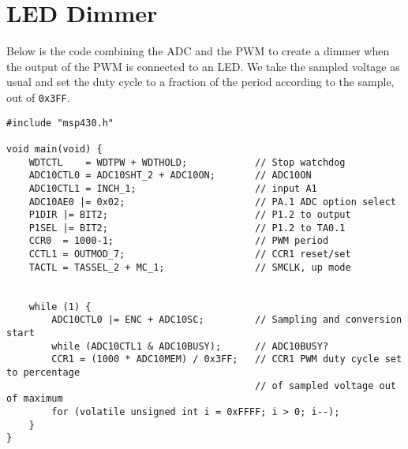 \documentclass[letterpaper]{article}
\begin{document}
	\section{LED Dimmer}
		Below is the code combining the ADC and the PWM to create a dimmer when the output of the PWM is connected to an LED. We take the sampled voltage as usual and set the duty cycle to a fraction of the period according to the sample, out of \texttt{0x3FF}.
		\begin{verbatim}
#include "msp430.h"

void main(void) {
    WDTCTL    = WDTPW + WDTHOLD;            // Stop watchdog
    ADC10CTL0 = ADC10SHT_2 + ADC10ON;       // ADC10ON
    ADC10CTL1 = INCH_1;                     // input A1
    ADC10AE0 |= 0x02;                       // PA.1 ADC option select
    P1DIR |= BIT2;                          // P1.2 to output
    P1SEL |= BIT2;                          // P1.2 to TA0.1
    CCR0  = 1000-1;                         // PWM period
    CCTL1 = OUTMOD_7;                       // CCR1 reset/set
    TACTL = TASSEL_2 + MC_1;                // SMCLK, up mode


    while (1) {
        ADC10CTL0 |= ENC + ADC10SC;         // Sampling and conversion start
        while (ADC10CTL1 & ADC10BUSY);      // ADC10BUSY?
        CCR1 = (1000 * ADC10MEM) / 0x3FF;   // CCR1 PWM duty cycle set to percentage 
                                            // of sampled voltage out of maximum
        for (volatile unsigned int i = 0xFFFF; i > 0; i--);
    }
}
		\end{verbatim}
		
\end{document}
